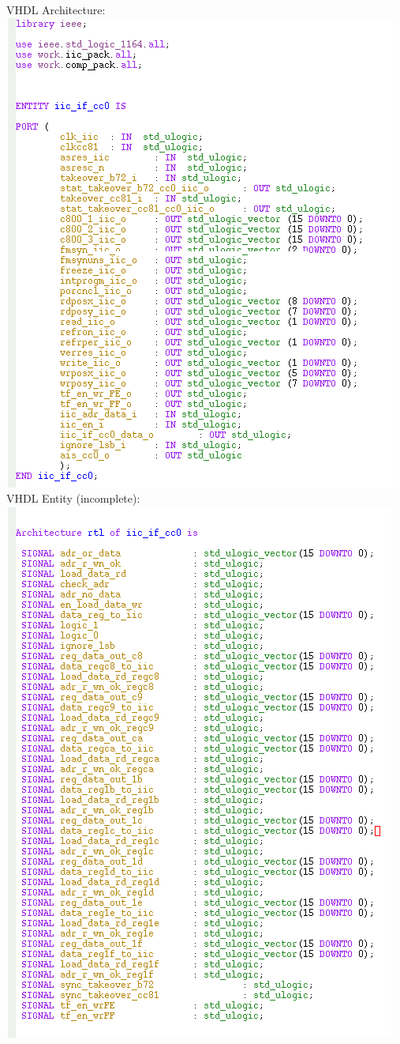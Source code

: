 \documentclass[a4paper,12pt]{report}
\begin{document}
\newpage
VHDL Architecture:\newline
\includegraphics[scale=0.9]{images/FRCA_part_entity.png}\newline
\newpage
VHDL Entity (incomplete):\newline
\includegraphics[scale=0.9]{images/FRCA_part0_arch.png}\newline
\end{document}
